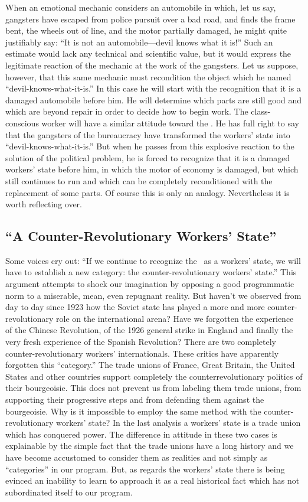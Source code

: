 When an emotional mechanic considers an automobile in which, let us say, gangsters have escaped from police pursuit over a bad road, and finds the frame bent, the wheels out of line, and the motor partially damaged, he might quite justifiably say: “It is not an automobile---devil knows what it is!” Such an estimate would lack any technical and scientific value, but it would express the legitimate reaction of the mechanic at the work of the gangsters. Let us suppose, however, that this same mechanic must recondition the object which he named “devil-knows-what-it-is.” In this case he will start with the recognition that it is a damaged automobile before him. He will determine which parts are still good and which are beyond repair in order to decide how to begin work. The class-conscious worker will have a similar attitude toward the \USSR. He has full right to say that the gangsters of the bureaucracy have transformed the workers’ state into “devil-knows-what-it-is.” But when he passes from this explosive reaction to the solution of the political problem, he is forced to recognize that it is a damaged workers’ state before him, in which the motor of economy is damaged, but which still continues to run and which can be completely reconditioned with the replacement of some parts. Of course this is only an analogy. Nevertheless it is worth reflecting over.

\subsection*{“A Counter-Revolutionary Workers’ State”}

Some voices cry out: “If we continue to recognize the \USSR\ as a workers’ state, we will have to establish a new category: the counter-revolution\-ary workers’ state.” This argument attempts to shock our imagination by opposing a good programmatic norm to a miserable, mean, even repugnant reality. But haven’t we observed from day to day since 1923 how the Soviet state has played a more and more counter-revolutionary role on the international arena? Have we forgotten the experience of the Chinese Revolution, of the 1926 general strike in England and finally the very fresh experience of the Spanish Revolution? There are two completely counter-revolutionary workers’ internationals. These critics have apparently forgotten this “category.” The trade unions of France, Great Britain, the United States and other countries support completely the counterrevolutionary politics of their bourgeoisie. This does not prevent us from labeling them trade unions, from supporting their progressive steps and from defending them against the bourgeoisie. Why is it impossible to employ the same method with the counter-revolutionary workers’ state? In the last analysis a workers’ state is a trade union which has conquered power. The difference in attitude in these two cases is explainable by the simple fact that the trade unions have a long history and we have become accustomed to consider them as realities and not simply as “categories” in our program. But, as regards the workers’ state there is being evinced an inability to learn to approach it as a real historical fact which has not subordinated itself to our program.

